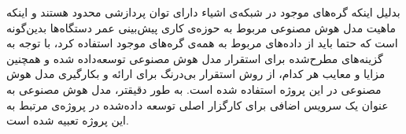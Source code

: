 بدلیل اینکه گره‌های موجود در شبکه‌ی اشیاء دارای توان پردازشی محدود هستند و اینکه ماهیت مدل هوش‌ مصنوعی مربوط به حوزه‌ی کاری پیش‌بینی عمر دستگاه‌ها بدین‌گونه است که حتما باید از داده‌های مربوط به همه‌ی گره‌های موجود استفاده کرد، با توجه به گزینه‌های مطرح‌شده برای استقرار مدل هوش مصنوعی توسعه‌داده شده و همچنین مزایا و معایب هر کدام، از روش استقرار بی‌درنگ برای ارائه و بکارگیری مدل هوش مصنوعی در این پروژه استفاده شده است. به طور دقیقتر، مدل هوش مصنوعی به عنوان یک سرویس اضافی برای کارگزار اصلی توسعه‌ داده‌شده در پروژه‌ی مرتبط 
به این پروژه تعبیه شده است. 